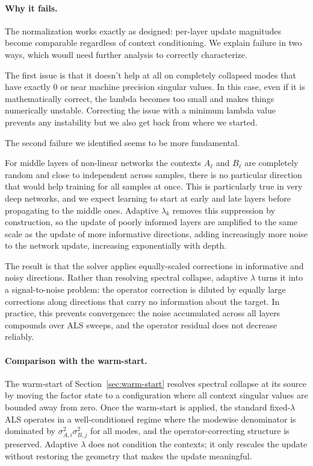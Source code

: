 \documentclass{article}
\begin{document}
\paragraph{Why it fails.}
The normalization works exactly as designed: per-layer update magnitudes become
comparable regardless of context conditioning. We explain failure in two ways, which woudl need further analysis to correctly characterize.

The first issue is that it doesn't help at all on completely collapsed modes that have exactly 0 or near machine precision singular values. In this case, even if it is mathematically correct, the lambda becomes too small and makes things numerically unstable. Correcting the issue with a minimum lambda value prevents any instability but we also get back from where we started.

The second failure we identified seems to be more fundamental.

For middle layers of non-linear networks the contexts $A_\ell$ and $B_\ell$ are completely random and close to independent across samples, there is no particular direction that would help training for all samples at once. This is particularly true in very deep networks, and we expect learning to start at early and late layers before propagating to the middle ones.
Adaptive $\lambda_k$ removes this suppression by construction, so the update of poorly informed layers are amplified to the same scale as the update of more informative directions, adding increasingly more noise to the network update, increasing exponentially with depth.

The result is that the solver applies equally-scaled corrections in informative and
noisy directions. Rather than resolving spectral collapse, adaptive $\lambda$ turns
it into a signal-to-noise problem: the operator correction is diluted by equally
large corrections along directions that carry no information about the target. In
practice, this prevents convergence: the noise accumulated across all layers compounds over ALS sweeps, and the operator residual does not
decrease reliably.


\paragraph{Comparison with the warm-start.}
The warm-start of Section~\ref{sec:warm-start} resolves spectral collapse at its
source by moving the factor state to a configuration where all context singular
values are bounded away from zero. Once the warm-start is applied, the standard
fixed-$\lambda$ ALS operates in a well-conditioned regime where the modewise
denominator is dominated by $\sigma_{A,i}^2 \sigma_{B,j}^2$ for all modes,
and the operator-correcting structure is preserved. Adaptive $\lambda$ does not
condition the contexts; it only rescales the update without restoring the
geometry that makes the update meaningful.
\end{document}
